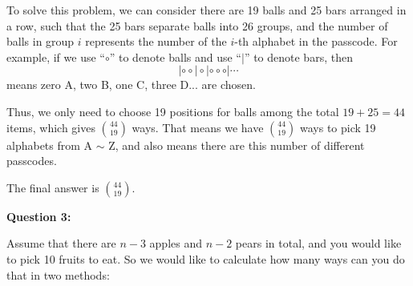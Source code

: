 \documentclass[a4paper,11pt]{article}
\begin{document}
\begin{spacing}{1.4}



    \hspace{2em}
    To solve this problem, we can consider there are 19 balls and 
    25 bars arranged in a row, such that the 25 bars separate balls into
    26 groups, and the number of balls in group $i$ represents
    the number of the $i$-th alphabet in the passcode. For example, 
    if we use ``$\circ$'' to denote balls and use ``$|$'' to denote bars, then
    $$|\circ \circ | \circ | \circ \circ \circ | \cdots$$
    means zero A, two B, one C, three D... are chosen.

    \hspace{2em}
    Thus, we only need to choose 19 positions for balls among the
    total $19+25=44$ items, which gives ${44\choose 19}$ ways. 
    That means we have ${44\choose 19}$ ways to pick 19 alphabets 
    from A $\sim $ Z, and also means there are this number of 
    different passcodes.

    \hspace{2em}
    The final answer is ${44\choose 19}$.


    \vspace{20pt}


    \textbf{Question 3:}

    \hspace{2em}
    Assume that there are $n-3$ apples and $n-2$ pears in total,
    and you would like to pick 10 fruits to eat. So we would like
    to calculate how many ways can you do that in two methods:
 

\end{spacing}
\end{document}
